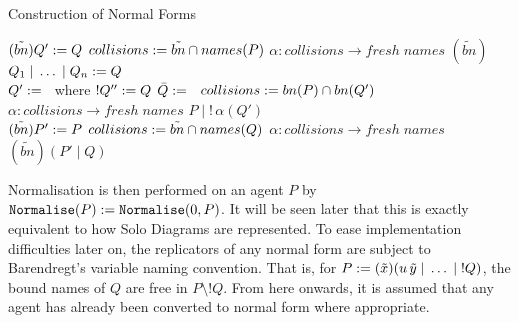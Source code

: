         \begin{breakablealgorithm}
            \caption{Construction of Normal Forms}
            \begin{algorithmic}[1]
                        \State$(\tilde{bn})Q' := Q$
                        \State$collisions := \tilde{bn} \cap names(P)$
                            \State$\alpha : collisions \rightarrow fresh\;names$
                            \State\Return{}
                        \Else
                            \State\Return$(\tilde{bn})$
                        \EndIf\\

                        \State$Q_1 \;|\; \ldots \;|\; Q_n := Q$
                        \State\Return{}\\

                        \State$Q' :=$~ where $!Q'' := Q$
                            \State$\bar{Q} :=$~
                            \State\Return{}
                        \Else
                            \State$collisions := bn(P) \cap bn(Q')$
                            \State$\alpha : collisions \rightarrow fresh\;names$
                            \State\Return$P \; | \; !\,\alpha(Q')$
                        \EndIf\\

                        \State$(\tilde{bn})P' := P$
                        \State$collisions := \tilde{bn} \cap names(Q)$
                            \State$\alpha : collisions \rightarrow fresh\;names$
                            \State\Return{}
                        \Else
                            \State\Return$(\tilde{bn})(P' \; | \; Q)$
                        \EndIf
                    \EndIf
                \EndFunction
            \end{algorithmic}
        \end{breakablealgorithm}
        Normalisation is then performed on an agent $P$ by $\texttt{Normalise}(P) := \texttt{Normalise}(0, P)$.
        It will be seen later that this is exactly equivalent to how Solo Diagrams are represented.
        To ease implementation difficulties later on, the replicators of any normal form are subject to Barendregt's variable naming convention.
        That is, for $P := (\tilde{x})(u \, \tilde{y} \; | \; \ldots \; | \; !Q)$, the bound names of $Q$ are free in $P \setminus !Q$.
        From here onwards, it is assumed that any agent has already been converted to normal form where appropriate.\\

